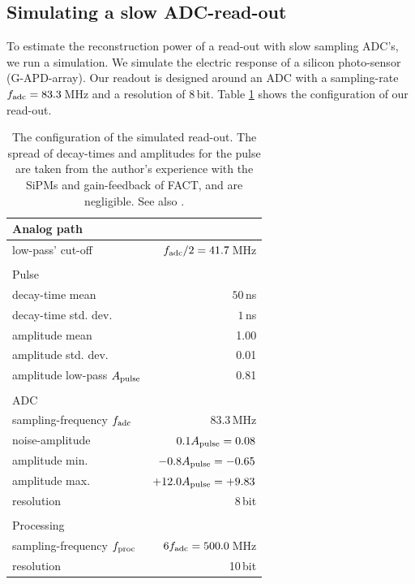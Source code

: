 \documentclass{article}%
\begin{document}
\begin{multicols}{2}
\section*{Simulating a slow ADC-read-out}%
\label{SecSimulating}%
%
To estimate the reconstruction power of a read-out with slow sampling ADC's, we run a simulation.
%
We simulate the electric response of a silicon photo-sensor (G-APD-array).
%
Our readout is designed around an ADC with a sampling-rate $f_\text{adc}{}=83.3$\,MHz and a resolution of 8\,bit.
%
Table \ref{TabReadOutConfig} shows the configuration of our read-out.
%
\begin{table}[H]
    \begin{center}
        \begin{tabular}{lr}
            Analog path & \\
            \hline
            low-pass' cut-off & $f_\text{adc}{}/2 = 41.7$\,MHz\\
            &\\
            Pulse & \\
            \hline
            decay-time mean & $50$\,ns\\
            decay-time std. dev. & $1$\,ns\\
            amplitude mean & 1.00\\
            amplitude std. dev. & 0.01\\
            amplitude low-pass $A_\text{pulse}{}$ & 0.81\\
            &\\
            ADC & \\
            \hline
            sampling-frequency $f_\text{adc}{}$ &$83.3$\,MHz\\
            noise-amplitude & $0.1A_\text{pulse}{} = 0.08$\\
            amplitude min. & $-0.8A_\text{pulse}{} = -0.65$\\
            amplitude max. & $+12.0A_\text{pulse}{} = +9.83$\\
            resolution & 8\,bit\\
            &\\
            Processing & \\
            \hline
            sampling-frequency $f_\text{proc}{}$& $6f_\text{adc}{} = 500.0$\,MHz\\
            resolution & 10\,bit\\
        \end{tabular}
        \caption{%
The configuration of the simulated read-out. The spread of decay-times and amplitudes for the pulse are taken from the author's experience with the SiPMs and gain-feedback of FACT, and are negligible. See also \cite{fact-performance}.
}
        \label{TabReadOutConfig}
    \end{center}
\end{table}
%

\end{multicols}
\end{document}
